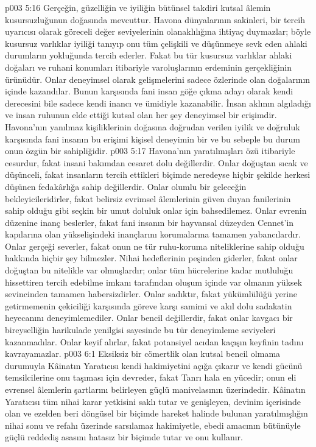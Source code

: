 \vs p003 5:16 Gerçeğin, güzelliğin ve iyiliğin bütünsel takdiri kutsal âlemin kusursuzluğunun doğasında mevcuttur. Havona dünyalarının sakinleri, bir tercih uyarıcısı olarak göreceli değer seviyelerinin olanaklılığına ihtiyaç duymazlar; böyle kusursuz varlıklar iyiliği tanıyıp onu tüm çelişkili ve düşünmeye sevk eden ahlaki durumların yokluğunda tercih ederler. Fakat bu tür kusursuz varlıklar ahlaki doğaları ve ruhani konumları itibariyle varoluşlarının erdeminin gerçekliğinin ürünüdür. Onlar deneyimsel olarak gelişmelerini sadece özlerinde olan doğalarının içinde kazandılar. Bunun karşısında fani insan göğe çıkma adayı olarak kendi derecesini bile sadece kendi inancı ve ümidiyle kazanabilir. İnsan aklının algıladığı ve insan ruhunun elde ettiği kutsal olan her şey deneyimsel bir erişimdir. Havona’nın yanılmaz kişiliklerinin doğasına doğrudan verilen iyilik ve doğruluk karşısında fani insanın bu erişimi kişisel deneyimin bir ve bu sebeple bu durum onun özgün bir sahipliğidir.
\vs p003 5:17 Havona’nın yaratılmışları özü itibariyle cesurdur, fakat insani bakımdan cesaret dolu değillerdir. Onlar doğuştan sıcak ve düşünceli, fakat insanların tercih ettikleri biçimde neredeyse hiçbir şekilde herkesi düşünen fedakârlığa sahip değillerdir. Onlar olumlu bir geleceğin bekleyicileridirler, fakat belirsiz evrimsel âlemlerinin güven duyan fanilerinin sahip olduğu gibi seçkin bir umut doluluk onlar için bahsedilemez. Onlar evrenin düzenine inanç beslerler, fakat fani insanın bir hayvansal düzeyden Cennet’in kapılarına olan yükselişindeki inançlarını korumalarına tamamen yabancılardır. Onlar gerçeği severler, fakat onun ne tür ruhu\hyp{}koruma niteliklerine sahip olduğu hakkında hiçbir şey bilmezler. Nihai hedeflerinin peşinden giderler, fakat onlar doğuştan bu nitelikle var olmuşlardır; onlar tüm hücrelerine kadar mutluluğu hissettiren tercih edebilme imkanı tarafından oluşum içinde var olmanın yüksek sevincinden tamamen habersizdirler. Onlar sadıktır, fakat yükümlülüğü yerine getirmemenin çekiciliği karşısında göreve karşı samimi ve akıl dolu sadakatin heyecanını deneyimlemediler. Onlar bencil değillerdir, fakat onlar kavgacı bir bireyselliğin harikulade yenilgisi sayesinde bu tür deneyimleme seviyeleri kazanmadılar. Onlar keyif alırlar, fakat potansiyel acıdan kaçışın keyfinin tadını kavrayamazlar.
\vs p003 6:1 Eksiksiz bir cömertlik olan kutsal bencil olmama durumuyla Kâinatın Yaratıcısı kendi hakimiyetini açığa çıkarır ve kendi gücünü temsilcilerine onu taşıması için devreder, fakat Tanrı hala en yücedir; onun eli evrensel âlemlerin şartlarını belirleyen güçlü manivelasının üzerindedir. Kâinatın Yaratıcısı tüm nihai karar yetkisini saklı tutar ve genişleyen, devinim içerisinde olan ve ezelden beri döngüsel bir biçimde hareket halinde bulunan yaratılmışlığın nihai sonu ve refahı üzerinde sarsılamaz hakimiyetle, ebedi amacının bütünüyle güçlü reddediş asasını hatasız bir biçimde tutar ve onu kullanır.
